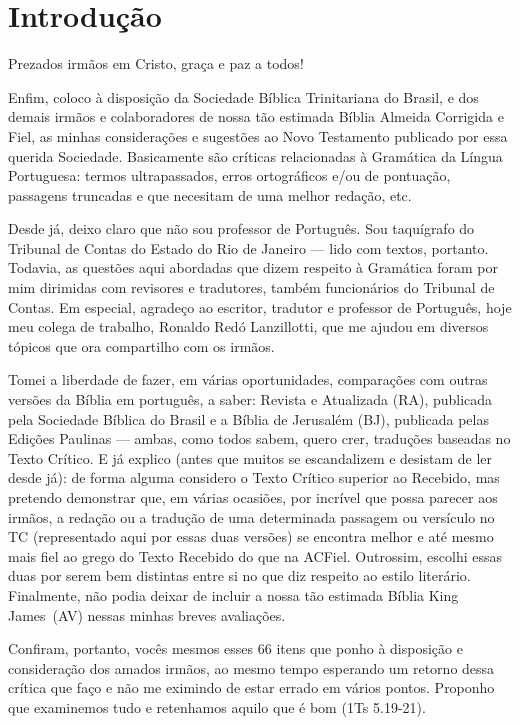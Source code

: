\chapter{Introdução}

Prezados irmãos em Cristo, graça e paz a todos!

Enfim, coloco à disposição da Sociedade Bíblica Trinitariana do
Brasil, e dos demais irmãos e colaboradores de nossa tão estimada
Bíblia Almeida Corrigida e Fiel, as minhas considerações e sugestões
ao Novo Testamento publicado por essa querida Sociedade. Basicamente
são críticas relacionadas à Gramática da Língua Portuguesa: termos
ultrapassados, erros ortográficos e/ou de pontuação, passagens
truncadas e que necesitam de uma melhor redação, etc.

Desde já, deixo claro que não sou professor de Português. Sou
taquígrafo do Tribunal de Contas do Estado do Rio de Janeiro --- lido
com textos, portanto. Todavia, as questões aqui abordadas que dizem
respeito à Gramática foram por mim dirimidas com revisores e
tradutores, também funcionários do Tribunal de Contas. Em especial,
agradeço ao escritor, tradutor e professor de Português, hoje meu
colega de trabalho, Ronaldo Redó Lanzillotti, que me ajudou em
diversos tópicos que ora compartilho com os irmãos.

Tomei a liberdade de fazer, em várias oportunidades, comparações com
outras versões da Bíblia em português, a saber: Revista e Atualizada
(RA), publicada pela Sociedade Bíblica do Brasil e a Bíblia de
Jerusalém (BJ), publicada pelas Edições Paulinas --- ambas, como todos
sabem, quero crer, traduções baseadas no Texto Crítico. E já explico
(antes que muitos se escandalizem e desistam de ler desde já): de
forma alguma considero o Texto Crítico superior ao Recebido, mas
pretendo demonstrar que, em várias ocasiões, por incrível que possa
parecer aos irmãos, a redação ou a tradução de uma determinada
passagem ou versículo no TC (representado aqui por essas duas versões)
se encontra melhor e até mesmo mais fiel ao grego do Texto Recebido do
que na ACFiel. Outrossim, escolhi essas duas por serem bem
distintas entre si no que diz respeito ao estilo literário.
Finalmente, não podia deixar de incluir a nossa tão estimada Bíblia King James~(AV) nessas minhas breves avaliações.

Confiram, portanto, vocês mesmos esses 66 itens que ponho à disposição
e consideração dos amados irmãos, ao mesmo tempo esperando um retorno
dessa crítica que faço e não me eximindo de estar errado em vários
pontos. Proponho que examinemos tudo e retenhamos aquilo que é bom
(1Ts 5.19-21).


